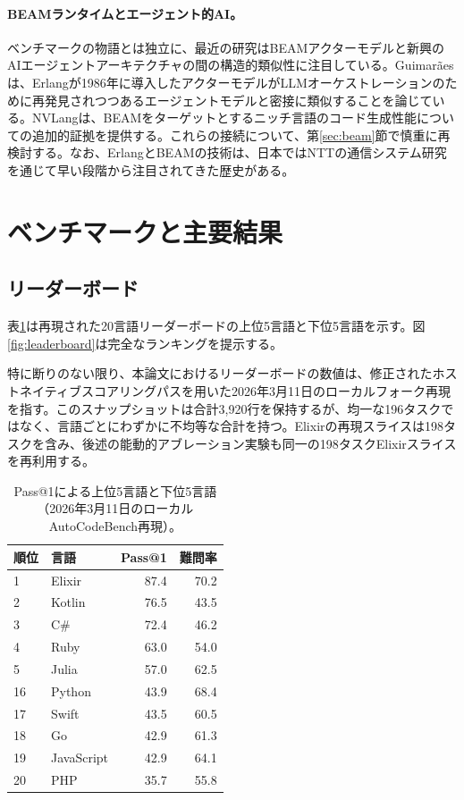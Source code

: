 \documentclass[11pt]{article}
\makeatletter
\newcommand{\acb}{AutoCodeBench}
\newcommand{\passatone}{Pass@1}
\makeatother
\begin{document}
\paragraph{BEAMランタイムとエージェント的AI。}
ベンチマークの物語とは独立に、最近の研究はBEAMアクターモデルと新興のAIエージェントアーキテクチャの間の構造的類似性に注目している。Guimarãesは、Erlangが1986年に導入したアクターモデルがLLMオーケストレーションのために再発見されつつあるエージェントモデルと密接に類似することを論じている\cite{guimaraes}。NVLangは、BEAMをターゲットとするニッチ言語のコード生成性能についての追加的証拠を提供する\cite{nvlang}。これらの接続について、第\ref{sec:beam}節で慎重に再検討する。なお、ErlangとBEAMの技術は、日本ではNTTの通信システム研究を通じて早い段階から注目されてきた歴史がある。

\section{ベンチマークと主要結果}

\subsection{リーダーボード}

表\ref{tab:topbottom}は再現された20言語リーダーボードの上位5言語と下位5言語を示す。図\ref{fig:leaderboard}は完全なランキングを提示する。

特に断りのない限り、本論文におけるリーダーボードの数値は、修正されたホストネイティブスコアリングパスを用いた2026年3月11日のローカルフォーク再現を指す。このスナップショットは合計3{,}920行を保持するが、均一な196タスクではなく、言語ごとにわずかに不均等な合計を持つ。Elixirの再現スライスは198タスクを含み、後述の能動的アブレーション実験も同一の198タスクElixirスライスを再利用する。

\begin{table}[H]
\centering
\caption{\passatone{}による上位5言語と下位5言語（2026年3月11日のローカル\acb{}再現）。}
\label{tab:topbottom}
\begin{tabular}{llrr}
\toprule
順位 & 言語 & \passatone{} & 難問率 \\
\midrule
1 & Elixir & 87.4 & 70.2 \\
2 & Kotlin & 76.5 & 43.5 \\
3 & C\# & 72.4 & 46.2 \\
4 & Ruby & 63.0 & 54.0 \\
5 & Julia & 57.0 & 62.5 \\
\midrule
16 & Python & 43.9 & 68.4 \\
17 & Swift & 43.5 & 60.5 \\
18 & Go & 42.9 & 61.3 \\
19 & JavaScript & 42.9 & 64.1 \\
20 & PHP & 35.7 & 55.8 \\
\bottomrule
\end{tabular}
\end{table}
\end{document}
